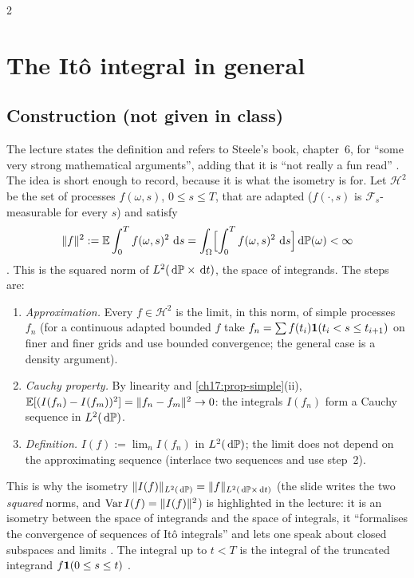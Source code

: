 \begin{paracol}{2}
\section{The It\^o integral in general}\label{ch17:sec-general}

\subsection{Construction (not given in class)}\label{ch17:sec-constr}
The lecture states the definition and refers to Steele's book, chapter~6, for ``some very strong mathematical arguments'', adding that it is ``not
really a fun read'' . The idea is short enough to record, because it is what the isometry is for.
Let $\mathcal H^2$ be the set of processes $f(\omega,s)$, $0\le s\le T$, that are adapted ($f(\cdot,s)$ is $\mathcal F_s$-measurable
for every $s$) and satisfy
\begin{equation}\label{ch17:eq-h2}
  \|f\|^2:=\mathbb{E}\int_0^Tf(\omega,s)^2\,\,\mathrm{d} s=\int_\Omega\Bigl[\int_0^Tf(\omega,s)^2\,\,\mathrm{d} s\Bigr]\,\mathrm{d}\mathbb{P}(\omega)<\infty
\end{equation}
. This is the squared norm of $L^2(\,\mathrm{d}\mathbb{P}\times\,\mathrm{d} t)$, the space of integrands. The steps are:
\begin{enumerate}[1.]
  \item \emph{Approximation.} Every $f\in\mathcal H^2$ is the limit, in this norm, of simple processes $f_n$ (for a continuous adapted bounded $f$ take
        $f_n=\sum f(t_i)\mathbf{1}(t_i<s\le t_{i+1})$ on finer and finer grids and use bounded convergence; the general case is a density argument).
  \item \emph{Cauchy property.} By linearity and \cref{ch17:prop-simple}(ii), $\mathbb{E}[(I(f_n)-I(f_m))^2]=\|f_n-f_m\|^2\to0$: the integrals $I(f_n)$ form a Cauchy
        sequence in $L^2(\,\mathrm{d}\mathbb{P})$.
  \item \emph{Definition.} $I(f):=\lim_nI(f_n)$ in $L^2(\,\mathrm{d}\mathbb{P})$; the limit does not depend on the approximating sequence
        (interlace two sequences and use step~2).
\end{enumerate}
This is why the isometry $\|I(f)\|_{L^2(\,\mathrm{d}\mathbb{P})}=\|f\|_{L^2(\,\mathrm{d}\mathbb{P}\times\,\mathrm{d} t)}$ (the slide writes the two \emph{squared} norms, and
$\operatorname{Var} I(f)=\|I(f)\|^2$) is highlighted in the lecture: it is an isometry between the space of integrands and the space of integrals, it ``formalises the convergence of
sequences of It\^o integrals'' and lets one speak about closed subspaces and limits .
The integral up to $t<T$ is the integral of the truncated integrand $f\mathbf{1}(0\le s\le t)$ .


\end{paracol}
